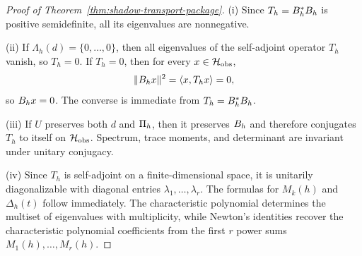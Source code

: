 
\begin{proof}[Proof of Theorem~\ref{thm:shadow-transport-package}]
\label{proof:thm:shadow-transport-package}
(i) Since $T_h=\CCLeak{d}{h}^*\CCLeak{d}{h}$ is positive semidefinite, all its
eigenvalues are nonnegative.

(ii) If $\Lambda_h(d)=\{0,\dots,0\}$, then all eigenvalues of the self-adjoint
operator $T_h$ vanish, so $T_h=0$. If $T_h=0$, then for every
$x\in\cH_{\mathrm{obs}}$,
\[
\|\CCLeak{d}{h}x\|^2=\langle x,T_hx\rangle=0,
\]
so $\CCLeak{d}{h}x=0$. The converse is immediate from
$T_h=\CCLeak{d}{h}^*\CCLeak{d}{h}$.

(iii) If $U$ preserves both $d$ and $\CCPi{h}$, then it preserves
$\CCLeak{d}{h}$ and therefore conjugates $T_h$ to itself on
$\cH_{\mathrm{obs}}$. Spectrum, trace moments, and determinant are invariant
under unitary conjugacy.

(iv) Since $T_h$ is self-adjoint on a finite-dimensional space, it is
unitarily diagonalizable with diagonal entries $\lambda_1,\dots,\lambda_r$.
The formulas for $M_k(h)$ and $\Delta_h(t)$ follow immediately. The
characteristic polynomial determines the multiset of eigenvalues with
multiplicity, while Newton's identities recover the characteristic polynomial
coefficients from the first $r$ power sums $M_1(h),\dots,M_r(h)$.
\end{proof}
